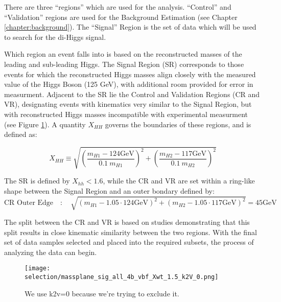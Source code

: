         There are three ``regions'' which are used for the analysis.
        ``Control'' and ``Validation'' regions are used for the Background Estimation (see Chapter \ref{chapter:background}).
        The ``Signal'' Region is the set of data which will be used to search for the di-Higgs signal.

        Which region an event falls into is based on the reconstructed masses of the leading and sub-leading Higgs.
        The Signal Region (SR) corresponds to those events for which the reconstructed Higgs masses
            align closely with the measured value of the Higgs Boson (125 GeV), with additional room provided for error in measurment.
        Adjacent to the SR lie the Control and Validation Regions (CR and VR),
            designating events with kinematics very similar to the Signal Region,
            but with reconstructed Higgs masses incompatible with experimental measurment (see Figure \ref{fig:region_definition}).
        A quantity $X_{HH}$ governs the boundaries of these regions, and is defined as:

        \begin{equation}
            X_{HH} \equiv \sqrt{\left(\frac{m_{H1} - 124\textrm{GeV}}{0.1 \ m_{H1}}\right)^{2}
                + \left(\frac{m_{H2} - 117\textrm{GeV}}{0.1 \ m_{H2}}\right)^{2}}
            \label{eq:xhh}
        \end{equation}
        
        The SR is defined by $X_{hh} < 1.6$,
            while the CR and VR are set within a ring-like shape between the Signal Region
            and an outer bondary defined by:
        \begin{equation}
            \text{CR\ Outer\ Edge} \quad : \quad \sqrt{ \left(m_{H1} - 1.05 \cdot 124\textrm{GeV}\right)^2
                +  \left(m_{H2} - 1.05 \cdot 117\textrm{GeV}\right)^2 } = 45\textrm{GeV}
            \label{eq:cr_out}
        \end{equation}
        
        The split between the CR and VR is based on studies demonstrating that this split results in
            close kinematic similarity between the two regions.
        With the final set of data samples selected and placed into the required subsets, 
            the process of analyzing the data can begin.

        \begin{figure}[tbh]
            \texttt{[image: selection/massplane\_sig\_all\_4b\_vbf\_Xwt\_1.5\_k2V\_0.png]}
            \caption{
                We use k2v=0 because we're trying to exclude it.\cite{hh4b_2021_int_note}
            }
            \label{fig:region_definition}
        \end{figure}
